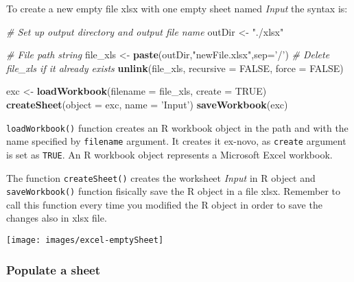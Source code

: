 \documentclass[]{book}
\newenvironment{Shaded}{\begin{snugshade}}{\end{snugshade}}
\newcommand{\KeywordTok}[1]{\textcolor[rgb]{0.13,0.29,0.53}{\textbf{{#1}}}}
\newcommand{\DataTypeTok}[1]{\textcolor[rgb]{0.13,0.29,0.53}{{#1}}}
\newcommand{\StringTok}[1]{\textcolor[rgb]{0.31,0.60,0.02}{{#1}}}
\newcommand{\CommentTok}[1]{\textcolor[rgb]{0.56,0.35,0.01}{\textit{{#1}}}}
\newcommand{\OtherTok}[1]{\textcolor[rgb]{0.56,0.35,0.01}{{#1}}}
\newcommand{\NormalTok}[1]{{#1}}
\begin{document}
To create a new empty file xlsx with one empty sheet named \emph{Input}
the syntax is:

\begin{Shaded}
\begin{Highlighting}[]
\CommentTok{# Set up output directory and output file name  }
\NormalTok{outDir <-}\StringTok{ "./xlsx"} 
\end{Highlighting}
\end{Shaded}

\begin{Shaded}
\begin{Highlighting}[]
\CommentTok{# File path string}
\NormalTok{file_xls <-}\StringTok{ }\KeywordTok{paste}\NormalTok{(outDir,}\StringTok{"newFile.xlsx"}\NormalTok{,}\DataTypeTok{sep=}\StringTok{'/'}\NormalTok{)}
\CommentTok{# Delete file_xls if it already exists }
\KeywordTok{unlink}\NormalTok{(file_xls, }\DataTypeTok{recursive =} \OtherTok{FALSE}\NormalTok{, }\DataTypeTok{force =} \OtherTok{FALSE}\NormalTok{)}
\end{Highlighting}
\end{Shaded}

\begin{Shaded}
\begin{Highlighting}[]
\NormalTok{exc <-}\StringTok{ }\KeywordTok{loadWorkbook}\NormalTok{(}\DataTypeTok{filename =} \NormalTok{file_xls, }\DataTypeTok{create =} \OtherTok{TRUE}\NormalTok{)}
\KeywordTok{createSheet}\NormalTok{(}\DataTypeTok{object =} \NormalTok{exc, }\DataTypeTok{name =} \StringTok{'Input'}\NormalTok{)}
\KeywordTok{saveWorkbook}\NormalTok{(exc)}
\end{Highlighting}
\end{Shaded}

\texttt{loadWorkbook()} function creates an R workbook object in the
path and with the name specified by \texttt{filename} argument. It
creates it ex-novo, as \texttt{create} argument is set as \texttt{TRUE}.
An R workbook object represents a Microsoft Excel workbook.

The function \texttt{createSheet()} creates the worksheet \emph{Input}
in R object and \texttt{saveWorkbook()} function fisically save the R
object in a file xlsx. Remember to call this function every time you
modified the R object in order to save the changes also in xlsx file.

\texttt{[image: images/excel-emptySheet]}

\subsubsection{Populate a sheet}\label{populate-a-sheet}
\end{document}
